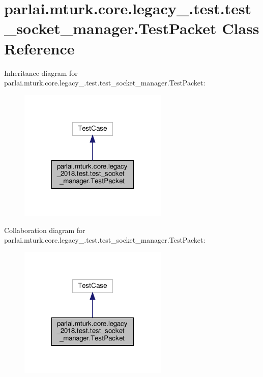 \hypertarget{classparlai_1_1mturk_1_1core_1_1legacy__2018_1_1test_1_1test__socket__manager_1_1TestPacket}{}\section{parlai.\+mturk.\+core.\+legacy\+\_.\+test.\+test\+\_\+socket\+\_\+manager.\+Test\+Packet Class Reference}
\label{classparlai_1_1mturk_1_1core_1_1legacy__2018_1_1test_1_1test__socket__manager_1_1TestPacket}


Inheritance diagram for parlai.\+mturk.\+core.\+legacy\+\_.\+test.\+test\+\_\+socket\+\_\+manager.\+Test\+Packet\+:\nopagebreak
\begin{figure}[H]
\begin{center}
\leavevmode
\includegraphics[width=201pt]{da/def/classparlai_1_1mturk_1_1core_1_1legacy__2018_1_1test_1_1test__socket__manager_1_1TestPacket__inherit__graph}
\end{center}
\end{figure}


Collaboration diagram for parlai.\+mturk.\+core.\+legacy\+\_.\+test.\+test\+\_\+socket\+\_\+manager.\+Test\+Packet\+:\nopagebreak
\begin{figure}[H]
\begin{center}
\leavevmode
\includegraphics[width=201pt]{dd/d56/classparlai_1_1mturk_1_1core_1_1legacy__2018_1_1test_1_1test__socket__manager_1_1TestPacket__coll__graph}
\end{center}
\end{figure}
